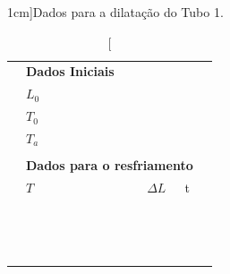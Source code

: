 \begin{table}[!ht]
\caption[][1cm]{Dados para a dilatação do Tubo 1.}
\label{Tab:DadosTubo1}
\centering
	\begin{tabular}{lllll}
		\toprule
		&\textbf{Dados Iniciais}\\
		\cmidrule{2-3}
		& \cellcolor[gray]{0.89}$L_0$ &\cellcolor[gray]{0.92}\\
		& \cellcolor[gray]{0.95}$T_0$ & \cellcolor[gray]{0.97}\\
		& \cellcolor[gray]{0.89}$T_a$ & \cellcolor[gray]{0.92}\\
		\cmidrule{2-3}
\\
		&\multicolumn{3}{l}{\textbf{Dados para o resfriamento}} \\
		\cmidrule{2-4}
		& $T$ & $\Delta L$ & t &\\
		\cmidrule{2-4}
		& \cellcolor[gray]{0.89} \phantom{xxxxxxxxxxxxxxxxxxxx}& \cellcolor[gray]{0.92} \phantom{xxxxxxxxxxxxxxxxxxxx} &  \cellcolor[gray]{0.89} \phantom{xxxxxxxxxxxxxxxxxxxx} \\
		& \cellcolor[gray]{0.95} & \cellcolor[gray]{0.97} & \cellcolor[gray]{0.95} \\
		& \cellcolor[gray]{0.89} & \cellcolor[gray]{0.92} & \cellcolor[gray]{0.89} \\
		& \cellcolor[gray]{0.95} & \cellcolor[gray]{0.97} & \cellcolor[gray]{0.95} \\
		& \cellcolor[gray]{0.89} & \cellcolor[gray]{0.92} & \cellcolor[gray]{0.89} \\
		& \cellcolor[gray]{0.95} & \cellcolor[gray]{0.97} & \cellcolor[gray]{0.95} \\
		& \cellcolor[gray]{0.89} & \cellcolor[gray]{0.92} & \cellcolor[gray]{0.89} \\
		& \cellcolor[gray]{0.95} & \cellcolor[gray]{0.97} & \cellcolor[gray]{0.95} \\
		& \cellcolor[gray]{0.89} & \cellcolor[gray]{0.92} & \cellcolor[gray]{0.89} \\
		& \cellcolor[gray]{0.95} & \cellcolor[gray]{0.97} & \cellcolor[gray]{0.95} \\
		& \cellcolor[gray]{0.89} & \cellcolor[gray]{0.92} & \cellcolor[gray]{0.89} \\
		& \cellcolor[gray]{0.95} & \cellcolor[gray]{0.97} & \cellcolor[gray]{0.95} \\
		& \cellcolor[gray]{0.89} & \cellcolor[gray]{0.92} & \cellcolor[gray]{0.89} \\
		& \cellcolor[gray]{0.95} & \cellcolor[gray]{0.97} & \cellcolor[gray]{0.95} \\

\end{tabular}
\end{table}
